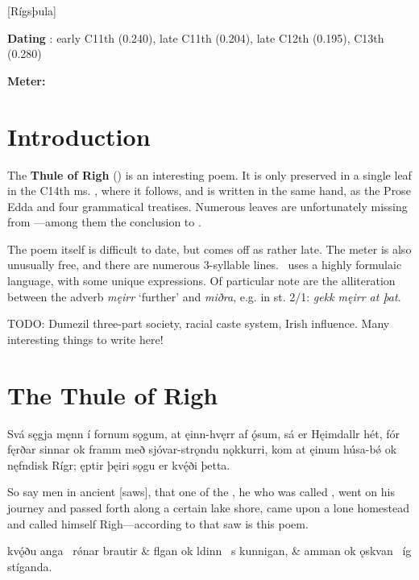 [Rígsþula]

\begin{flushright}%
\textbf{Dating} \parencite{Sapp2022}: early C11th (0.240), late C11th (0.204), late C12th (0.195), C13th (0.280)

\textbf{Meter:} \Fornyrdislag%
\end{flushright}

\section{Introduction}

The \textbf{Thule of Righ} (\Rigsthula) is an interesting poem.  It is only preserved in a single leaf in the C14th ms. \Wormianus, where it follows, and is written in the same hand, as the Prose Edda and four grammatical treatises.  Numerous leaves are unfortunately missing from \Wormianus—among them the conclusion to \Rigsthula.

The poem itself is difficult to date, but comes off as rather late.  The meter is also unusually free, and there are numerous 3-syllable lines.  \Rigsthula\ uses a highly formulaic language, with some unique expressions.  Of particular note are the alliteration between the adverb \emph{męirr} ‘further’ and \emph{miðra}, e.g. in st. 2/1: \emph{gekk męirr at þat}.

TODO: Dumezil three-part society, racial caste system, Irish influence. Many interesting things to write here!

\sectionline

\section{The Thule of Righ}%

\bpg\bpa{}%
Svá sęgja męnn í fornum sǫgum, at ęinn-hvęrr af ǫ́sum, sá er Hęimdallr hét, fór fęrðar sinnar ok framm með sjóvar-strǫndu nǫkkurri, kom at ęinum húsa-bǿ ok nęfndisk Rígr; ęptir þęiri sǫgu er kvę́ði þetta.\epa

\bpb So say men in ancient [saws], that one of the , he who was called , went on his journey and passed forth along a certain lake shore, came upon a lone homestead and called himself Righ—according to that saw is this poem.\epb\epg


\bvg\bva{}%
 kvǫ́ðu anga \hld\ rǿnar brautir &
flgan ok ldinn \hld\ s kunnigan, &
amman ok ǫskvan \hld\ íg stíganda.\eva

